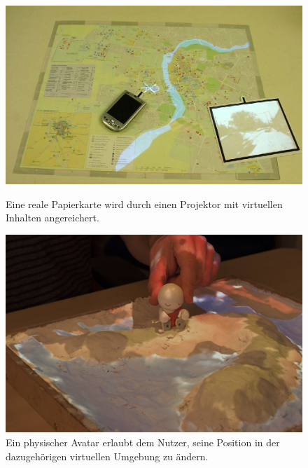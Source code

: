 \begin{figure}[h]
\begin{minipage}[t]{0.48\textwidth}
    \centering
    \includegraphics[width=\textwidth, height=0.25\textheight]{figures/reitmayr2005_helicopter_map}
    \caption{Eine reale Papierkarte wird durch einen Projektor mit virtuellen Inhalten angereichert. }
    \label{fig:reitmayr2005_helicopter_map}
\end{minipage}%
\hfill
\begin{minipage}[t]{0.48\textwidth}
    \centering
    \includegraphics[width=\textwidth, height=0.25\textheight]{figures/roo2017_sandbox_island}
    \caption{Ein physischer Avatar erlaubt dem Nutzer, seine Position in der dazugehörigen virtuellen Umgebung zu ändern. }
    \label{fig:roo2017_sandbox_island}
\end{minipage}
\end{figure}

